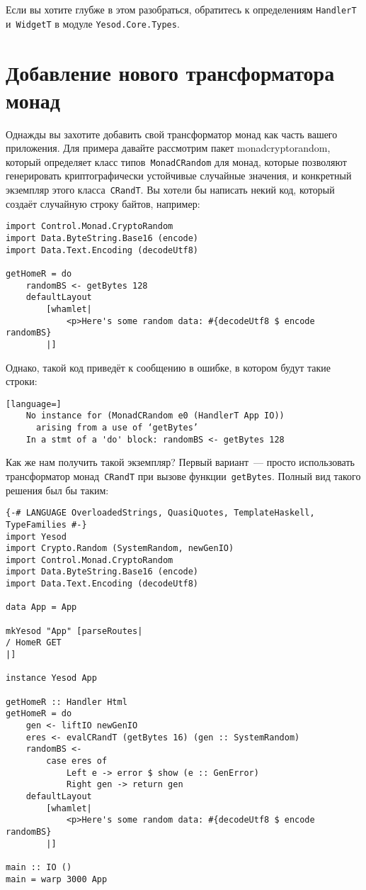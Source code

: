 Если вы хотите глубже в этом разобраться, обратитесь к определениям
\lstinline'HandlerT' и~\lstinline'WidgetT' в модуле
\lstinline'Yesod.Core.Types'.

\section{Добавление нового трансформатора монад}
Однажды вы захотите добавить свой трансформатор монад как часть вашего
приложения. Для примера давайте рассмотрим пакет
%
{monadcryptorandom}, который определяет класс типов~\lstinline'MonadCRandom'
для монад, которые позволяют генерировать криптографически устойчивые случайные
значения, и конкретный экземпляр этого класса~\lstinline'CRandT'. Вы хотели бы
написать некий код, который создаёт случайную строку байтов, например:
\begin{lstlisting}
import Control.Monad.CryptoRandom
import Data.ByteString.Base16 (encode)
import Data.Text.Encoding (decodeUtf8)

getHomeR = do
    randomBS <- getBytes 128
    defaultLayout
        [whamlet|
            <p>Here's some random data: #{decodeUtf8 $ encode randomBS}
        |]
\end{lstlisting}

Однако, такой код приведёт к сообщению в ошибке, в котором будут такие строки:
\begin{lstlisting}[language=]
    No instance for (MonadCRandom e0 (HandlerT App IO))
      arising from a use of ‘getBytes’
    In a stmt of a 'do' block: randomBS <- getBytes 128
\end{lstlisting}

Как же нам получить такой экземпляр? Первый вариант~--- просто использовать
трансформатор монад~\lstinline'CRandT' при вызове функции~\lstinline'getBytes'.
Полный вид такого решения был бы таким:
\begin{lstlisting}
{-# LANGUAGE OverloadedStrings, QuasiQuotes, TemplateHaskell, TypeFamilies #-}
import Yesod
import Crypto.Random (SystemRandom, newGenIO)
import Control.Monad.CryptoRandom
import Data.ByteString.Base16 (encode)
import Data.Text.Encoding (decodeUtf8)

data App = App

mkYesod "App" [parseRoutes|
/ HomeR GET
|]

instance Yesod App

getHomeR :: Handler Html
getHomeR = do
    gen <- liftIO newGenIO
    eres <- evalCRandT (getBytes 16) (gen :: SystemRandom)
    randomBS <-
        case eres of
            Left e -> error $ show (e :: GenError)
            Right gen -> return gen
    defaultLayout
        [whamlet|
            <p>Here's some random data: #{decodeUtf8 $ encode randomBS}
        |]

main :: IO ()
main = warp 3000 App
\end{lstlisting}

